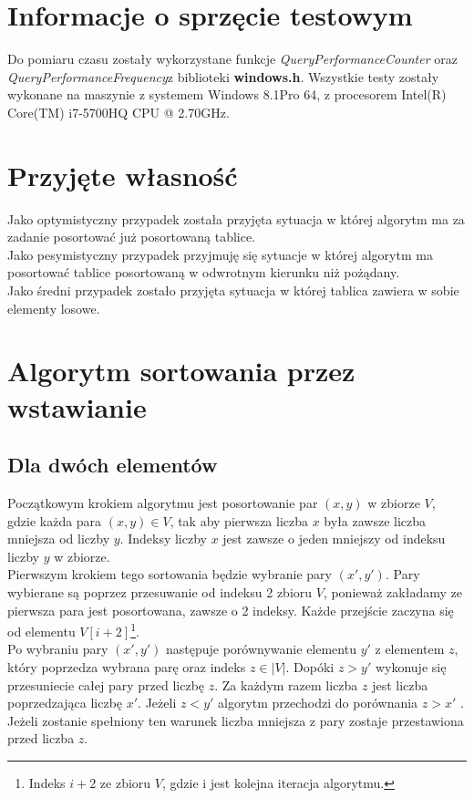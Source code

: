 \section{Informacje o sprzęcie testowym}
Do pomiaru czasu zostały wykorzystane funkcje \textit{QueryPerformanceCounter} oraz \textit{QueryPerformanceFrequency}z biblioteki \textbf{windows.h}. Wszystkie testy zostały wykonane na maszynie z systemem Windows 8.1Pro 64, z procesorem Intel(R) Core(TM) i7-5700HQ CPU @ 2.70GHz.
\section{Przyjęte własność}
Jako optymistyczny przypadek została przyjęta sytuacja w której algorytm ma za zadanie posortować już posortowaną tablice.\\
Jako pesymistyczny przypadek przyjmuję się sytuacje w której algorytm ma posortować tablice posortowaną w odwrotnym kierunku niż pożądany.\\
Jako średni przypadek zostało przyjęta sytuacja w której tablica zawiera w sobie elementy losowe.
\section{Algorytm sortowania przez wstawianie}

\subsection*{Dla dwóch elementów}

Początkowym krokiem algorytmu jest posortowanie  par $(x,y) $ w zbiorze $V  $, gdzie każda para $(x,y) \in V$,  tak aby pierwsza liczba $x$  była zawsze liczba mniejsza od liczby $y$. Indeksy liczby $x$ jest zawsze o jeden mniejszy od indeksu liczby $y$ w zbiorze.\\
 Pierwszym krokiem tego sortowania będzie wybranie  pary $(x',y')$. Pary wybierane są poprzez przesuwanie od indeksu 2 zbioru $V$, ponieważ zakładamy ze pierwsza para jest posortowana, zawsze o 2 indeksy. Każde przejście zaczyna się od elementu $V[i+2]$\footnote{Indeks $i+2$ ze zbioru $V$, gdzie i jest kolejna iteracja algorytmu.}.\\
Po wybraniu pary $(x',y')$ następuje porównywanie elementu $y'$ z elementem $z$, który poprzedza wybrana parę oraz indeks $z \in \lvert V \rvert $. Dopóki  $z > y'$  wykonuje się przesuniecie całej pary przed liczbę $z$. Za każdym razem liczba $z$ jest liczba poprzedzająca liczbę $x'$.
Jeżeli  $z < y'$ algorytm przechodzi do porównania $z > x'$ . Jeżeli zostanie spełniony ten warunek liczba mniejsza z pary zostaje przestawiona przed liczba $z$.
